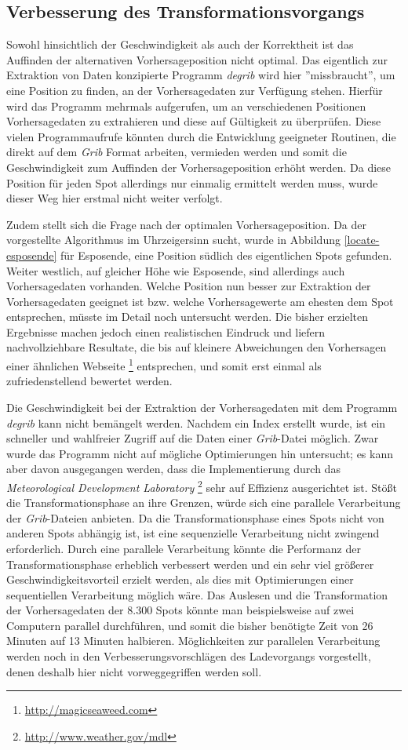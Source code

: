 \subsection{Verbesserung des Transformationsvorgangs}
Sowohl hinsichtlich der Geschwindigkeit als auch der Korrektheit ist
das Auffinden der alternativen Vorhersageposition nicht optimal. Das
eigentlich zur Extraktion von Daten konzipierte Programm
\textit{degrib} wird hier ''missbraucht'', um eine Position zu finden,
an der Vorhersagedaten zur Verfügung stehen. Hierfür wird das Programm
mehrmals aufgerufen, um an verschiedenen Positionen Vorhersagedaten zu
extrahieren und diese auf Gültigkeit zu überprüfen. Diese vielen
Programmaufrufe könnten durch die Entwicklung geeigneter Routinen, die
direkt auf dem \textit{Grib} Format arbeiten, vermieden werden und
somit die Geschwindigkeit zum Auffinden der Vorhersageposition erhöht
werden. Da diese Position für jeden Spot allerdings nur einmalig
ermittelt werden muss, wurde dieser Weg hier erstmal nicht weiter
verfolgt.

Zudem stellt sich die Frage nach der optimalen Vorhersageposition. Da
der vorgestellte Algorithmus im Uhrzeigersinn sucht, wurde in
Abbildung \ref{locate-esposende} für Esposende, eine Position südlich
des eigentlichen Spots gefunden. Weiter westlich, auf gleicher Höhe
wie Esposende, sind allerdings auch Vorhersagedaten vorhanden. Welche
Position nun besser zur Extraktion der Vorhersagedaten geeignet ist
bzw. welche Vorhersagewerte am ehesten dem Spot entsprechen, müsste im
Detail noch untersucht werden. Die bisher erzielten Ergebnisse machen
jedoch einen realistischen Eindruck und liefern nachvollziehbare
Resultate, die bis auf kleinere Abweichungen den Vorhersagen einer
ähnlichen Webseite \footnote{\url{http://magicseaweed.com}}
entsprechen, und somit erst einmal als zufriedenstellend bewertet
werden.

Die Geschwindigkeit bei der Extraktion der Vorhersagedaten mit dem
Programm \textit{degrib} kann nicht bemängelt werden. Nachdem ein
Index erstellt wurde, ist ein schneller und wahlfreier Zugriff auf die
Daten einer \textit{Grib}-Datei möglich. Zwar wurde das Programm nicht
auf mögliche Optimierungen hin untersucht; es kann aber davon
ausgegangen werden, dass die Implementierung durch das
\textit{Meteorological Development Laboratory}
\footnote{\url{http://www.weather.gov/mdl}} sehr auf Effizienz
ausgerichtet ist. Stößt die Transformationsphase an ihre Grenzen,
würde sich eine parallele Verarbeitung der \textit{Grib}-Dateien
anbieten. Da die Transformationsphase eines Spots nicht von anderen
Spots abhängig ist, ist eine sequenzielle Verarbeitung nicht zwingend
erforderlich. Durch eine parallele Verarbeitung könnte die Performanz
der Transformationsphase erheblich verbessert werden und ein sehr viel
größerer Geschwindigkeitsvorteil erzielt werden, als dies mit
Optimierungen einer sequentiellen Verarbeitung möglich wäre. Das
Auslesen und die Transformation der Vorhersagedaten der 8.300 Spots
könnte man beispielsweise auf zwei Computern parallel durchführen, und
somit die bisher benötigte Zeit von 26 Minuten auf 13 Minuten
halbieren. Möglichkeiten zur parallelen Verarbeitung werden noch in
den Verbesserungsvorschlägen des Ladevorgangs vorgestellt, denen
deshalb hier nicht vorweggegriffen werden soll.

